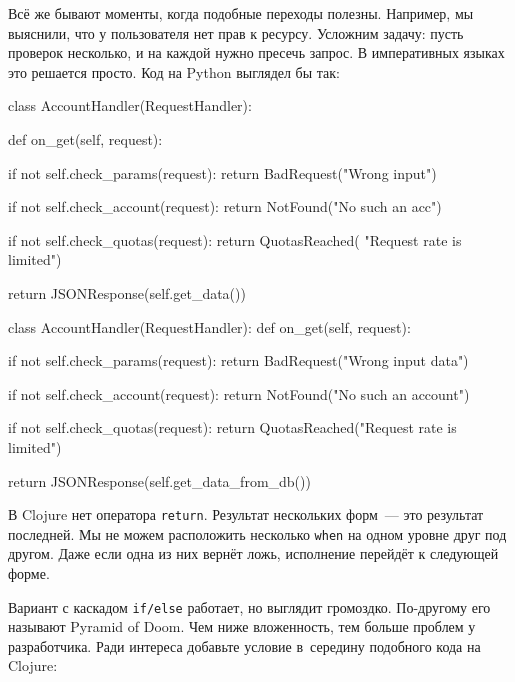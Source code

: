 
Всё же бывают моменты, когда подобные переходы полезны. Например, мы выяснили,
что у пользователя нет прав к ресурсу. Усложним задачу: пусть проверок
несколько, и на каждой нужно пресечь запрос. В императивных языках это решается
просто. Код на Python выглядел бы так:


\ifnarrow

\begin{english}
  \begin{python}
class AccountHandler(RequestHandler):

  def on_get(self, request):

    if not self.check_params(request):
      return BadRequest("Wrong input")

    if not self.check_account(request):
      return NotFound("No such an acc")

    if not self.check_quotas(request):
      return QuotasReached(
             "Request rate is limited")

    return JSONResponse(self.get_data())
  \end{python}
\end{english}

\else

\begin{english}
  \begin{python}
class AccountHandler(RequestHandler):
  def on_get(self, request):

    if not self.check_params(request):
      return BadRequest("Wrong input data")

    if not self.check_account(request):
      return NotFound("No such an account")

    if not self.check_quotas(request):
      return QuotasReached("Request rate is limited")

    return JSONResponse(self.get_data_from_db())
  \end{python}
\end{english}

\fi

В Clojure нет оператора \verb|return|. Результат нескольких форм~--- это результат
последней. Мы не можем расположить несколько \verb|when| на одном уровне друг
под другом. Даже если одна из них вернёт ложь, исполнение перейдёт к следующей
форме.


Вариант с каскадом \verb|if/else| работает, но выглядит громоздко. По-другому
его называют Pyramid of Doom. Чем ниже вложенность, тем больше проблем у
разработчика. Ради интереса добавьте условие в~середину подобного кода на
Clojure:

